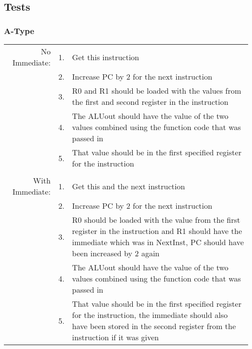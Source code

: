 \documentclass{article}
\begin{document}
	\subsection{Tests}
		\subsubsection{A-Type}
			\begin{tabular}{ r  r  p{12cm} }
					No Immediate:   & 1. & Get this instruction\\
					                & 2. & Increase PC by 2 for the next instruction\\
					                & 3. & R0 and R1 should be loaded with the values from the first and second register in the instruction\\
					                & 4. & The ALUout should have the value of the two values combined using the function code that was passed in\\
					                & 5. & That value should be in the first specified register for the instruction\\ 
					                &    & \\
					With Immediate: & 1. & Get this and the next instruction\\
					                & 2. & Increase PC by 2 for the next instruction\\
					                & 3. & R0 should be loaded with the value from the first register in the instruction and R1 should have the immediate which was in NextInst, PC should have been increased by 2 again\\
					                & 4. & The ALUout should have the value of the two values combined using the function code that was passed in\\
					                & 5. & That value should be in the first specified register for the instruction, the immediate should also have been stored in the second register from the instruction if it was given\\
			\end{tabular}
\end{document}
